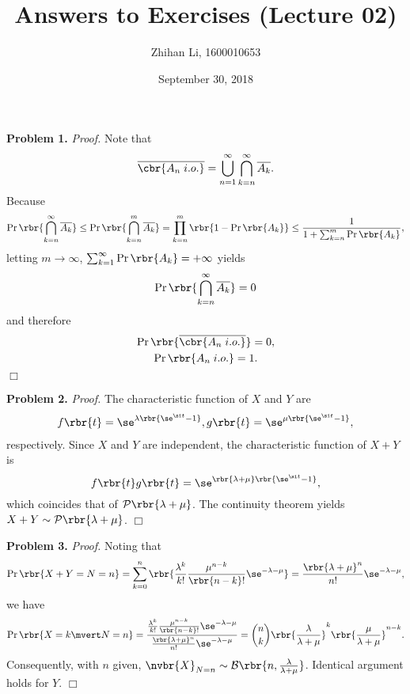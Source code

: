 \documentclass[english, nochinese]{pnote}
\title{Answers to Exercises (Lecture 02)}
\author{Zhihan Li, 1600010653}
\date{September 30, 2018}
\DeclareMathOperator\oppr{\mathrm{Pr}}
\begin{document}
\maketitle

\textbf{Problem 1.} \textit{Proof.} Note that
\begin{equation} \label{Eq:IODef}
\overline{\cbr{ A_n \mathrel{i.o.} }} = \bigcup_{ n = 1 }^{\infty} \bigcap_{ k = n }^{\infty} \overline{A_k}.
\end{equation}
Because
\begin{equation}
\oppr \rbr{ \bigcap_{ k = n }^{\infty} \overline{A_k} } \le \oppr \rbr{ \bigcap_{ k = n }^m \overline{A_k} } = \prod_{ k = n }^m \rbr{ 1 - \oppr \rbr{A_k} } \le \frac{1}{ 1 + \sum_{ k = n }^m \oppr \rbr{A_k} },
\end{equation}
letting $ m \rightarrow \infty $, $ \sum_{ k = 1 }^{\infty} \oppr \rbr{A_k} = +\infty $ yields
\begin{equation}
\oppr \rbr{ \bigcap_{ k = n }^{\infty} \overline{A_k} } = 0
\end{equation}
and therefore
\begin{gather}
\oppr \rbr{\overline{\cbr{ A_n \mathrel{i.o.} }}} = 0, \\
\oppr \rbr{ A_n \mathrel{i.o.} } = 1.
\end{gather}
\hfill$\Box$

\textbf{Problem 2.} \textit{Proof.} The characteristic function of $X$ and $Y$ are
\begin{gather}
f \rbr{t} =  \se^{ \lambda \rbr{ \se^{ \si t } - 1 } },
g \rbr{t} =  \se^{ \mu \rbr{ \se^{ \si t } - 1 } },
\end{gather}
respectively. Since $X$ and $Y$ are independent, the characteristic function of $ X + Y $ is
\begin{equation}
f \rbr{t} g \rbr{t} = \se^{ \rbr{ \lambda + \mu } \rbr{ \se^{ \si t } - 1 } },
\end{equation}
which coincides that of $ \mathcal{P} \rbr{ \lambda + \mu } $. The continuity theorem yields $ X + Y \sim \mathcal{P} \rbr{ \lambda + \mu } $.
\hfill$\Box$

\textbf{Problem 3.} \textit{Proof.} Noting that
\begin{equation}
\oppr \rbr{ X + Y = N = n } = \sum_{ k = 0 }^n \rbr{ \frac{\lambda^k}{ k ! } \frac{\mu^{ n - k }}{ \rbr{ n - k } ! } \se^{ -\lambda - \mu} } = \frac{\rbr{ \lambda + \mu }^n}{ n ! } \se^{ -\lambda - \mu},
\end{equation}
we have
\begin{equation}
\oppr \rbr{ X = k \mvert N = n } = \frac{ \frac{\lambda^k}{ k ! } \frac{\mu^{ n - k }}{ \rbr{ n - k } ! } \se^{ -\lambda - \mu} }{ \frac{\rbr{ \lambda + \mu }^n}{ n ! } \se^{ -\lambda - \mu} } = \binom{n}{k} \rbr{\frac{\lambda}{ \lambda + \mu }}^k \rbr{\frac{\mu}{ \lambda + \mu }}^{ n - k }.
\end{equation}
Consequently, with $n$ given, $ \nvbr{X}_{ N = n } \sim \mathcal{B} \rbr{ n, \frac{\lambda}{ \lambda + \mu } } $. Identical argument holds for $Y$.
\hfill$\Box$
\end{document}
